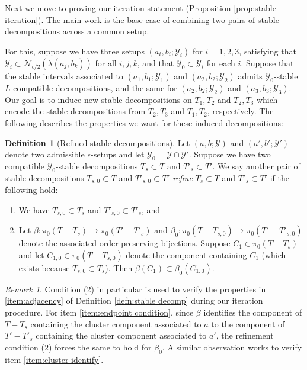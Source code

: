\documentclass{amsart}
\theoremstyle{definition}
\newtheorem{definition}[theorem]{Definition}
\theoremstyle{remark}
\newtheorem{remark}[theorem]{Remark}
\theoremstyle{definition}
\newcommand{\calN}{\mathcal{N}}
\newcommand{\calY}{\mathcal{Y}}
\begin{document}
Next we move to proving our iteration statement (Proposition \ref{prop:stable iteration}).  The main work is the base case of combining two pairs of stable decompositions across a common setup.

For this, suppose we have three setups $(a_i,b_i;\calY_i)$ for $i=1,2,3$, satisfying that $\calY_i \subset \calN_{\epsilon/2}(\lambda(a_j,b_k))$ for all $i,j,k$, and that $\calY_0 \subset \calY_i$ for each $i$.  Suppose that the stable intervals associated to $(a_1,b_1;\calY_1)$ and $(a_2,b_2;\calY_2)$ admits $\calY_0$-stable $L$-compatible decompositions, and the same for $(a_2,b_2;\calY_2)$ and $(a_3,b_3;\calY_3)$.  Our goal is to induce new stable decompositions on $T_1,T_2$ and $T_2,T_3$ which encode the stable decompositions from $T_2,T_3$ and $T_1,T_2$, respectively.  The following describes the properties we want for these induced decompositions:

\begin{definition}[Refined stable decompositions]\label{defn:refined decomp}
Let $(a,b;\calY)$ and $(a',b';\calY')$ denote two admissible $\epsilon$-setups and let $\calY_0 = \calY \cap \calY'$.  Suppose we have two compatible $\calY_0$-stable decompositions $T_s \subset T$ and $T'_s \subset T'$.  We say another pair of stable decompositions $T_{s,0} \subset T$ and $T'_{s,0} \subset T'$ \emph{refine} $T_s \subset T$ and $T'_s \subset T'$ if the following hold:
\begin{enumerate}
\item We have $T_{s,0} \subset T_s$ and $T'_{s,0} \subset T'_s$, and
\item Let $\beta:\pi_0(T - T_s) \to \pi_0(T'-T'_s)$ and $\beta_0:\pi_0(T-T_{s,0}) \to \pi_0(T' - T'_{s,0})$ denote the associated order-preserving bijections.  Suppose $C_1 \in \pi_0(T - T_s)$  and let $C_{1,0} \in \pi_0(T-T_{s,0})$ denote the component containing $C_1$ (which exists because $T_{s,0} \subset T_s$).  Then $\beta(C_1) \subset \beta_0(C_{1,0})$.
\end{enumerate}
\end{definition}

\begin{remark}\label{rem:purpose of refined}
Condition (2) in particular is used to verify the properties in \eqref{item:adjacency} of Definition \ref{defn:stable decomp} during our iteration procedure.  For item \eqref{item:endpoint condition}, since $\beta$ identifies the component of $T-T_s$ containing the cluster component associated to $a$ to the component of $T' - T'_s$ containing the cluster component associated to $a'$, the refinement condition (2) forces the same to hold for $\beta_0$.  A similar observation works to verify item \eqref{item:cluster identify}.
\end{remark}
\end{document}

